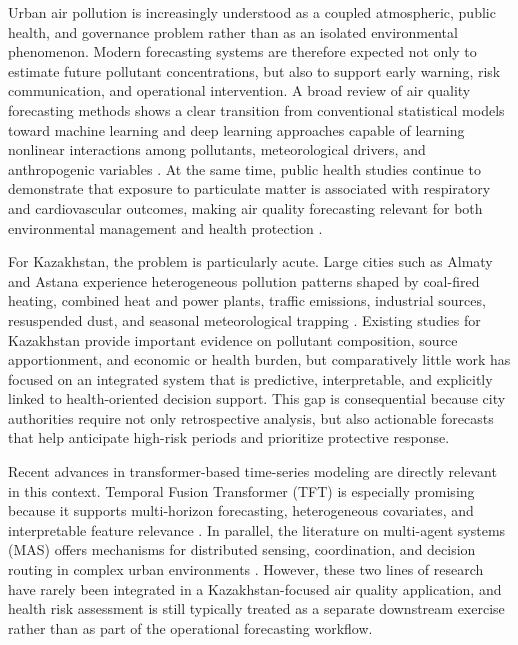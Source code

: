 \documentclass[pdflatex,sn-mathphys-num]{sn-jnl}
\begin{document}
Urban air pollution is increasingly understood as a coupled atmospheric, public health, and governance problem rather than as an isolated environmental phenomenon. Modern forecasting systems are therefore expected not only to estimate future pollutant concentrations, but also to support early warning, risk communication, and operational intervention. A broad review of air quality forecasting methods shows a clear transition from conventional statistical models toward machine learning and deep learning approaches capable of learning nonlinear interactions among pollutants, meteorological drivers, and anthropogenic variables \cite{mendez2023survey}. At the same time, public health studies continue to demonstrate that exposure to particulate matter is associated with respiratory and cardiovascular outcomes, making air quality forecasting relevant for both environmental management and health protection \cite{muratuly2025health}.

For Kazakhstan, the problem is particularly acute. Large cities such as Almaty and Astana experience heterogeneous pollution patterns shaped by coal-fired heating, combined heat and power plants, traffic emissions, industrial sources, resuspended dust, and seasonal meteorological trapping \cite{mukhtarov2023winter,ormanova2025astana,tursun2025sources}. Existing studies for Kazakhstan provide important evidence on pollutant composition, source apportionment, and economic or health burden, but comparatively little work has focused on an integrated system that is predictive, interpretable, and explicitly linked to health-oriented decision support. This gap is consequential because city authorities require not only retrospective analysis, but also actionable forecasts that help anticipate high-risk periods and prioritize protective response.

Recent advances in transformer-based time-series modeling are directly relevant in this context. Temporal Fusion Transformer (TFT) is especially promising because it supports multi-horizon forecasting, heterogeneous covariates, and interpretable feature relevance \cite{lim2021tft}. In parallel, the literature on multi-agent systems (MAS) offers mechanisms for distributed sensing, coordination, and decision routing in complex urban environments \cite{dragomir2013mas,zhu2021multisensing}. However, these two lines of research have rarely been integrated in a Kazakhstan-focused air quality application, and health risk assessment is still typically treated as a separate downstream exercise rather than as part of the operational forecasting workflow.
\end{document}
